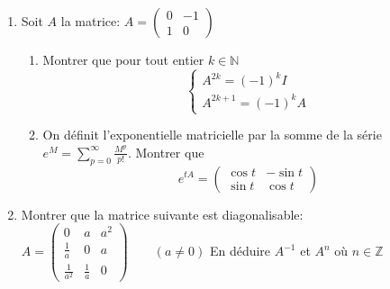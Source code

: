 \documentclass{article}[11pt]
\begin{document}
\begin{enumerate}
\item Soit $A$ la matrice: $\displaystyle A=\left(\begin{array}{cc} 0&-1\\1&0 \end{array}\right)$
\begin{enumerate}
\item Montrer que pour tout entier $k\in\mathbb{N}$
\[\left\{\begin{array}{l}
A^{2k}=(-1)^kI\\
A^{2k+1}=(-1)^kA
\end{array}\right.\]
\item On définit l'exponentielle matricielle par la somme de la série $\displaystyle e^M=\sum_{p=0}^\infty\frac{M^p}{p!}$. Montrer que
\[e^{tA}=\left(\begin{array}{cc} \cos t&-\sin t\\ \sin t&\cos t
\end{array}\right)\]

\end{enumerate}

\item Montrer que la matrice suivante est diagonalisable:
$ \displaystyle A=\left(\begin{array}{ccc} 0&a&a^2\\ \frac 1a&0&a\\\frac{1}{a^2}&\frac 1a&0
\end{array}\right)\qquad (a\neq 0)$
En déduire $A^{-1}$ et $A^n$ où $n\in\mathbb{Z}$




\end{enumerate}
\end{document}
